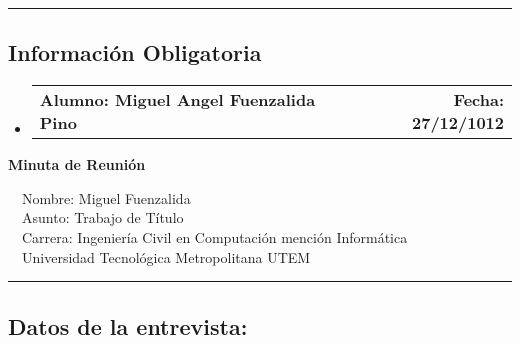 \documentclass[10pt,letterpaper]{article}
\makeatletter
\newcommand{\headerrow}[2]
{\begin{tabular*}{\linewidth}{l@{\extracolsep{\fill}}r}
	#1 &
	#2 \\
\end{tabular*}}
\makeatother
\begin{document}
\hrule
\vspace{-0.4em}
\subsection*{Información Obligatoria}

\begin{itemize}
	\parskip=0.1em

	\item 
	\headerrow
		{\textbf{Alumno: Miguel Angel Fuenzalida Pino}}
		{\textbf{Fecha: 27/12/1012}}

\end{itemize}
\newpage
\begin{center}
{\LARGE \textbf{Minuta de Reunión}}

\ \ \textbullet Nombre: Miguel Fuenzalida
\\
\ \ \textbullet Asunto: Trabajo de Título
\\
\ \ \textbullet Carrera: Ingeniería Civil en Computación mención Informática
\\
\ \ \textbullet Universidad Tecnológica Metropolitana UTEM
\end{center}

\hrule
\vspace{-0.4em}
\subsection*{Datos de la entrevista:}
\end{document}
